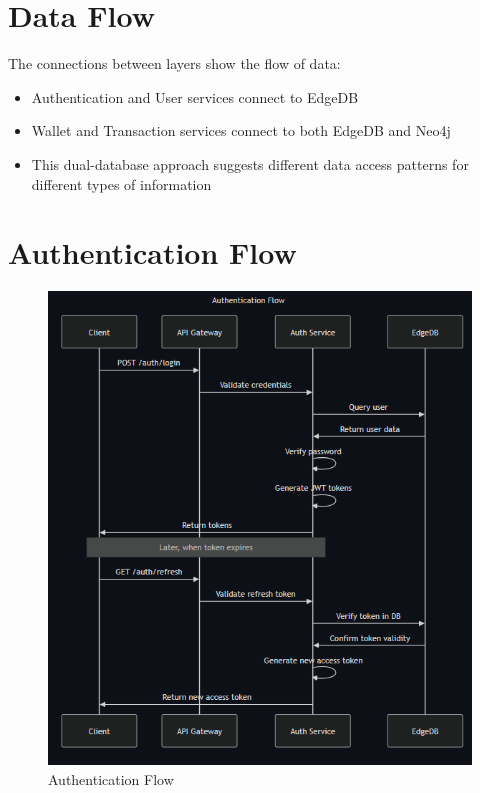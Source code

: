 \section{Data Flow}
The connections between layers show the flow of data:
\begin{itemize}
  \item Authentication and User services connect to EdgeDB
  \item Wallet and Transaction services connect to both EdgeDB and Neo4j
  \item This dual-database approach suggests different data access patterns for different types of information
\end{itemize}

\section{Authentication Flow}
\begin{figure}[h]
    \centering
    \includegraphics[width=\textwidth, keepaspectratio]{figures/authentication_flow.png}
    \caption{Authentication Flow}
    \label{fig:Authentication Flow}
\end{figure}

